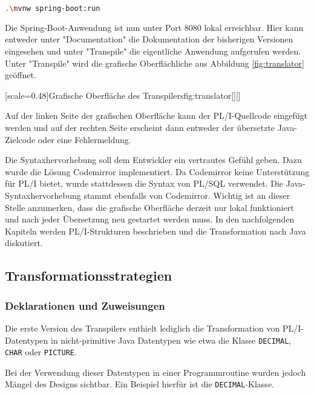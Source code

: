 \begin{lstlisting}[language=bash, caption=Build des Spring-Boot Projekts, label={lst:springboot}]
	.\mvnw spring-boot:run
\end{lstlisting}

Die Spring-Boot-Anwendung ist nun unter Port 8080 lokal erreichbar.
Hier kann entweder unter "Documentation" die Dokumentation der bisherigen Versionen eingesehen und unter "Transpile"
die eigentliche Anwendung aufgerufen werden.
Unter "Transpile" wird die grafische Oberflächliche aus Abbildung \ref{fig:translator} geöffnet.

[scale=0.48]{Grafische Oberfläche des Transpilers}{fig:translator}[][]

Auf der linken Seite der grafischen Oberfläche kann der PL/I-Quellcode eingefügt werden und auf der rechten Seite erscheint dann entweder der übersetzte Java-Zielcode oder eine Fehlermeldung.

Die Syntaxhervorhebung soll dem Entwickler ein vertrautes Gefühl geben.
Dazu wurde die Lösung Codemirror implementiert. Da Codemirror keine Unterstützung für PL/I bietet, wurde stattdessen die Syntax von PL/SQL verwendet. Die Java-Syntaxhervorhebung stammt ebenfalls von Codemirror. Wichtig ist an dieser Stelle anzumerken, dass die grafische Oberfläche derzeit nur lokal funktioniert und nach jeder Übersetzung neu gestartet werden muss. 
In den nachfolgenden Kapiteln werden PL/I-Strukturen beschrieben und die Transformation nach Java diskutiert.
\pagebreak

\subsection{Transformationsstrategien}
\subsubsection{Deklarationen und Zuweisungen}
Die erste Version des Transpilers enthielt lediglich die Transformation von PL/I-Datentypen in nicht-primitive Java Datentypen wie etwa die Klasse \verb+DECIMAL+, \verb+CHAR+ oder \verb+PICTURE+.


Bei der Verwendung dieser Datentypen in einer Programmroutine wurden jedoch Mängel des Designs sichtbar. Ein Beispiel hierfür ist die \verb+DECIMAL+-Klasse.

